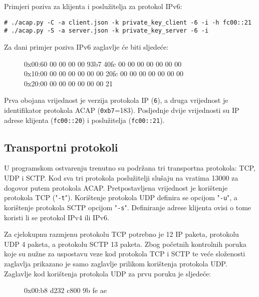 Primjeri poziva za klijenta i poslužitelja za protokol IPv6:
\begin{footnotesize}
\begin{verbatim}
# ./acap.py -C -a client.json -k private_key_client -6 -i -h fc00::21
# ./acap.py -S -a server.json -k private_key_server -6 -i
\end{verbatim}
\end{footnotesize}

Za dani primjer poziva IPv6 zaglavlje će biti sljedeće:

\begin{figure}[H]
\begin{footnotesize}
\begin{monoblock}
\noindent 0x00:\colorbox{blue!30}{6}0 00 00 00 00 93\colorbox{yellow!30}{b7} 40\colorbox{orange!30}{fc 00 00 00 00 00 00 00} \\
0x10:\colorbox{orange!30}{00 00 00 00 00 00 00 20}\colorbox{purple!30}{fc 00 00 00 00 00 00 00} \\
0x20:\colorbox{purple!30}{00 00 00 00 00 00 00 21}
\end{monoblock}
\end{footnotesize}
\vspace{-10pt}
\end{figure}

Prva obojana vrijednost je verzija protokola IP (\texttt{6}), a druga vrijednost
je identifikator protokola ACAP (\texttt{0xb7}=183). Posljednje dvije
vrijednosti su IP adrese klijenta (\texttt{fc00::20}) i poslužitelja
(\texttt{fc00::21}).

\subsection{Transportni protokoli}

U programskom ostvarenju trenutno su podržana tri transportna protokola: TCP, UDP i
SCTP. Kod sva tri protokola poslužitelji slušaju na vratima 13000 za dogovor
putem protokola ACAP.
Pretpostavljena vrijednost je korištenje protokola TCP ("\texttt{-t}").
Korištenje protokola UDP definira se opcijom "\texttt{-u}", a korištenje
protokola SCTP opcijom "\texttt{-s}". Definiranje adrese klijenta ovisi o tome
koristi li se protokol IPv4 ili IPv6.

Za cjelokupnu razmjenu protokolu TCP potrebno je 12 IP paketa, protokolu UDP 4
paketa, a protokolu SCTP 13 paketa. Zbog početnih kontrolnih poruka koje su
nužne za uspostavu veze kod protokola TCP i SCTP te  veće složenosti zaglavlja
prikazano je samo zaglavlje prilikom korištenja protokola UDP. Zaglavlje kod
korištenja protokola UDP za prvu poruku je sljedeće:
\begin{figure}[h]
\begin{footnotesize}
\begin{monoblock}
\noindent 0x00:\colorbox{blue!30}{b8 d2}\colorbox{yellow!30}{32 c8}00 9b fe ae
\end{monoblock}
\end{footnotesize}
\vspace{-10pt}
\end{figure}

